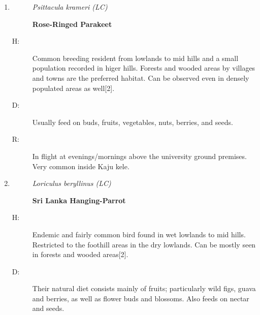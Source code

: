 \begin{itemize}
\begin{enumerate}
\begin{description}%
\item[]%
\textit{Psittacula eupatria (LC)}%
\item[]%
\textbf{Alexandrine Parakeet}%
\end{description}%
\begin{description}%
\item[H: ]%
Uncommon breeding resident found in lowlands up to lower hills. Forests and wooded areas are the preffered habitat{[}2{]}.%
\item[D: ]%
Herbivorous and feeds on a variety of wild and cultivated seeds, buds, fruits, and nuts.%
\item[R: ]%
Kaju kele around the hotspot 2.%
\end{description}%
\item%
\begin{description}%
\item[]%
\textit{Psittacula krameri (LC)}%
\item[]%
\textbf{Rose{-}Ringed Parakeet}%
\end{description}%
\begin{description}%
\item[H: ]%
Common breeding resident from lowlands to mid hills and a small population recorded in higer hills. Forests and wooded areas by villages and towns are the preferred habitat. Can be observed even in densely populated areas as well{[}2{]}.%
\item[D: ]%
Usually feed on buds, fruits, vegetables, nuts, berries, and seeds.%
\item[R: ]%
In flight at evenings/mornings above the university ground premises. Very common inside Kaju kele.%
\end{description}%
\item%
\begin{description}%
\item[]%
\textit{Loriculus beryllinus (LC)}%
\item[]%
\textbf{Sri Lanka Hanging{-}Parrot}%
\end{description}%
\begin{description}%
\item[H: ]%
Endemic and fairly common bird found in wet lowlands to mid hills. Restricted to the foothill areas in the dry lowlands. Can be mostly seen in forests and wooded areas{[}2{]}.%
\item[D: ]%
Their natural diet consists mainly of fruits; particularly wild figs, guava and berries, as well as flower buds and blossoms. Also feeds on nectar and seeds.%

\end{description}
\end{enumerate}
\end{itemize}

